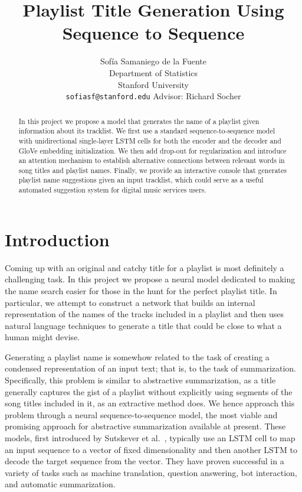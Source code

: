 \documentclass{article} %
\title{Playlist Title Generation Using Sequence to Sequence}
\author{
    Sof\'ia Samaniego de la Fuente \\
    Department of Statistics \\
    Stanford University \\
    \texttt{sofiasf@stanford.edu}
    \AND
    Advisor: Richard Socher 
}
\begin{document}
\maketitle

\begin{abstract}
In this project we propose a model that generates the name of a playlist given information about its tracklist. 
We first use a standard sequence-to-sequence model with unidirectional single-layer LSTM cells for both the encoder and the decoder and GloVe embedding initialization. 
We then add drop-out for regularization and introduce an attention mechanism to establish alternative connections between relevant words in song titles and playlist names.  
Finally, we provide an interactive console that generates playlist name suggestions given an input tracklist, which could serve as a useful automated suggestion system for digital music services users.   
\end{abstract}

\section{Introduction}
\label{sec:intro}

Coming up with an original and catchy title for a playlist is most definitely a challenging task. %
In this project we propose a neural model dedicated to making the name search easier for those in the hunt for the perfect playlist title. 
In particular, we attempt to construct a network that builds an internal representation of the names of the tracks included in a playlist and then uses natural language techniques to generate a title that could be close to what a human might devise. 

Generating a playlist name is somewhow related to the task of creating a condensed representation of an input text; that is, to the task of summarization.
Specifically, this problem is similar to abstractive summarization, as a title generally captures the gist of a playlist without explicitly using segments of the song titles included in it, as an extractive method does. 
We hence approach this problem through a neural sequence-to-sequence model, the most viable and promising approach for abstractive summarization available at present. 
These models, first introduced by Sutskever et al.~\cite{sutskever2014sequence}, typically use an LSTM cell to map an input sequence to a vector of fixed dimensionality and then another LSTM to decode the target sequence from the vector. 
They have proven successful in a variety of tasks such as machine translation, question answering, bot interaction, and automatic summarization.  
\end{document}

